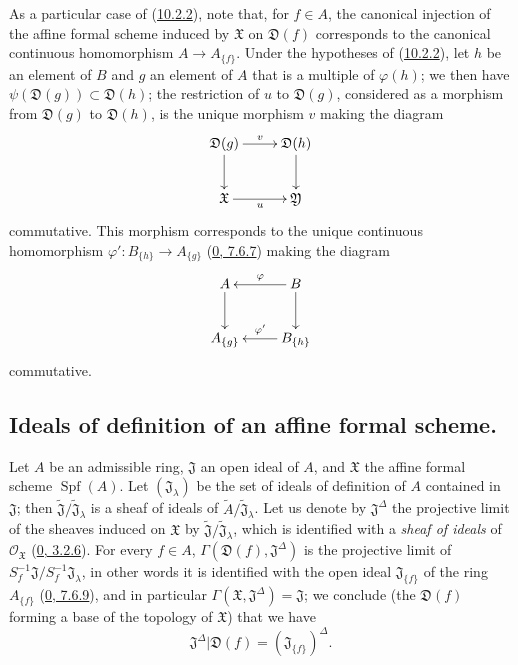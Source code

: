 \begin{env}[10.2.3]
\label{I.10.2.3}
As a particular case of (\hyperref[I.10.2.2]{10.2.2}), note that, for
$f\in A$, the canonical injection of the affine formal scheme induced by
$\mathfrak{X}$ on $\mathfrak{D}(f)$ corresponds to the canonical continuous
homomorphism $A\to A_{\{f\}}$. Under the hypotheses of
(\hyperref[I.10.2.2]{10.2.2}), let $h$ be an element of $B$ and $g$ an
element of $A$ that is a multiple of $\varphi(h)$; we then have
$\psi(\mathfrak{D}(g))\subset\mathfrak{D}(h)$; the restriction of $u$ to
$\mathfrak{D}(g)$, considered as a morphism from $\mathfrak{D}(g)$ to
$\mathfrak{D}(h)$, is the unique morphism $v$ making the
diagram
\[
  \xymatrix{
    \mathfrak{D}(g)\ar[r]^v\ar[d] &
    \mathfrak{D}(h)\ar[d]\\
    \mathfrak{X}\ar[r]_u &
    \mathfrak{Y}
  }
\]
commutative. This morphism corresponds to the unique continuous homomorphism
$\varphi':B_{\{h\}}\to A_{\{g\}}$
(\hyperref[0.7.6.7]{0, 7.6.7}) making the diagram
\[
  \xymatrix{
    A\ar[d] &
    B\ar[l]_\varphi\ar[d]\\
    A_{\{g\}} &
    B_{\{h\}}\ar[l]_{\varphi'}
  }
\]
commutative.
\end{env}

\subsection{Ideals of definition of an affine formal scheme.}
\label{subsection:I.10.3}

\begin{env}[10.3.1]
\label{I.10.3.1}
Let $A$ be an admissible ring, $\mathfrak{J}$ an open ideal of $A$, and
$\mathfrak{X}$ the affine formal scheme $\operatorname{Spf}(A)$. Let
$(\mathfrak{J}_\lambda)$ be the set of ideals of definition of $A$
contained in $\mathfrak{J}$; then
$\widetilde{\mathfrak{J}}/\widetilde{\mathfrak{J}}_\lambda$ is a
sheaf of ideals of
$\widetilde{A}/\widetilde{\mathfrak{J}}_\lambda$. Let us denote by
$\mathfrak{J}^\Delta$ the projective limit of the sheaves induced on
$\mathfrak{X}$ by
$\widetilde{\mathfrak{J}}/\widetilde{\mathfrak{J}}_\lambda$, which
is identified with a \emph{sheaf of ideals} of
$\mathscr{O}_{\mathfrak{X}}$ (\hyperref[0.3.2.6]{0, 3.2.6}). For every
$f\in A$, $\Gamma(\mathfrak{D}(f),\mathfrak{J}^\Delta)$ is the projective
limit of
$S_f^{-1}\mathfrak{J}/S_f^{-1}\mathfrak{J}_\lambda$, in other words it
is identified with the open ideal $\mathfrak{J}_{\{f\}}$ of the ring
$A_{\{f\}}$ (\hyperref[0.7.6.9]{0, 7.6.9}), and in particular
$\Gamma(\mathfrak{X},\mathfrak{J}^\Delta)=\mathfrak{J}$; we conclude
(the $\mathfrak{D}(f)$ forming a base of the topology of $\mathfrak{X}$)
that we have
\[
  \mathfrak{J}^\Delta|\mathfrak{D}(f)
  =(\mathfrak{J}_{\{f\}})^\Delta.
  \tag{10.3.1.1}\label{I.10.3.1.1}
\]
\end{env}

